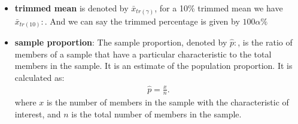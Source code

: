 \documentclass{report}
\begin{document}
\begin{itemize}
        \item \textbf{trimmed mean} is denoted by $\bar{x}_{tr(\gamma)}$, for a 10\% trimmed mean we have $\bar{x}_{tr(10)}:$. And we can say the trimmed percentage is given by $ 100\alpha \%$
        \item \textbf{sample proportion}: The sample proportion, denoted by \( \hat{p}: \), is the ratio of members of a sample that have a particular characteristic to the total members in the sample. It is an estimate of the population proportion. It is calculated as:
            \begin{align*}
                \hat{p} = \frac{x}{n}
            .\end{align*}
            where \( x \) is the number of members in the sample with the characteristic of interest, and \( n \) is the total number of members in the sample.


\end{itemize}
\end{document}
